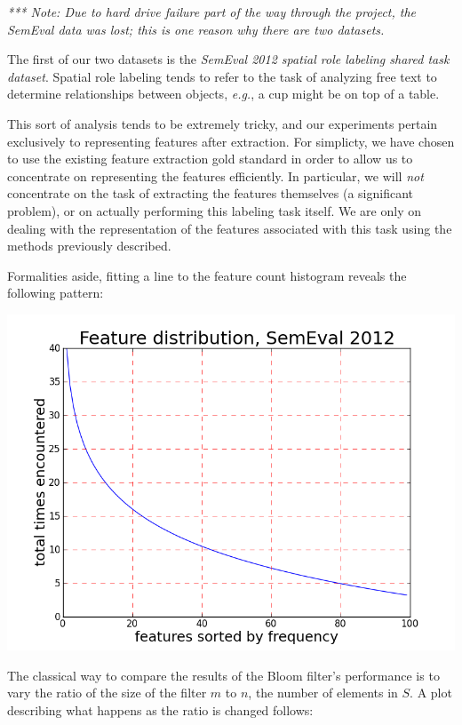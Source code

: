 \documentclass[11pt]{article}
\begin{document}
\textit{*** Note: Due to hard drive failure part of the way through the project, the SemEval data was lost; this is one reason why there are two datasets.}


The first of our two datasets is the \textit{SemEval 2012 spatial role labeling shared task dataset}. Spatial role labeling tends to refer to the task of analyzing free text to determine relationships between objects, \textit{e.g.}, a cup might be on top of a table.

This sort of analysis tends to be extremely tricky, and our experiments pertain exclusively to representing features after extraction. For simplicty, we have chosen to use the existing feature extraction gold standard in order to allow us to concentrate on representing the features efficiently. In particular, we will \textit{not} concentrate on the task of extracting the features themselves (a significant problem), or on actually performing this labeling task itself. We are only on dealing with the representation of the features associated with this task using the methods previously described.

Formalities aside, fitting a line to the feature count histogram reveals the following pattern:

\begin{center}
\includegraphics[scale=0.25]{dist1.png}
\end{center}


The classical way to compare the results of the Bloom filter's performance is to vary the ratio of the size of the filter $m$ to $n$, the number of elements in $S$. A plot describing what happens as the ratio is changed follows:
\end{document}

